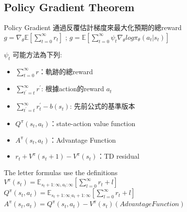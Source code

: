 \documentclass[14pt,a4paper]{report}  %
\begin{document}
\subsection{Policy Gradient Theorem}
Policy Gradient 通過反覆估計梯度來最大化預期的總reward\\[5pt]
$g = \nabla_\theta\mathbb{E}[\sum_{t=0}^\infty r_t]$ ; $g = \mathbb{E}[\sum_{t=0}^\infty\psi_t\nabla_\theta log\pi_\theta(a_t \vert s_t)]$\\[5pt]
\begin{normalsize}{$\psi_t$ 可能方法為下列:}\end{normalsize}
\begin{itemize}
\item $\sum_{t=0}^\infty r$：軌跡的總reward
\item $\sum_{t^{'}=t}^\infty r^{'}$: 根據action的reward $a_t$
\item $\sum_{t^{'}=t}^\infty r_t^{'}-b(s_t)$: 先前公式的基準版本
\item $Q^\pi(s_t,a_t)$：state-action value function
\item $A^\pi(s_t,a_t)$：Advantage Function
\item $r_t+V^\pi(s_t+1)-V^\pi(s_t)$：TD residual
\end{itemize}
The letter formulas use the definitions\\[5pt]
$V^\pi(s_t) = \mathbb{E}_{s_{t}+1:\infty,a_{t}:\infty}[\sum_{l=0}^\infty r_t+l]$\\[5pt]
$Q^\pi(s_t,a_t) = \mathbb{E}_{s_{t}+1:\infty_,a_{t}+1:\infty}[\sum_{l=0}^\infty r_t+l]$\\[5pt]
$A^\pi(s_t,a_t) = Q^\pi(s_t,a_t)-V^\pi(s_t)(Advantage Function)$\\[5pt]
\end{document}
